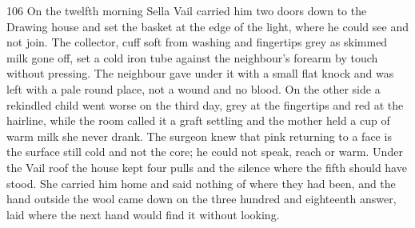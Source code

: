\begin{CRchronicle}{106}
On the twelfth morning Sella Vail carried him two doors down to the Drawing house and set the basket at the edge of the light, where he could see and not join. The collector, cuff soft from washing and fingertips grey as skimmed milk gone off, set a cold iron tube against the neighbour’s forearm by touch without pressing. The neighbour gave under it with a small flat knock and was left with a pale round place, not a wound and no blood. On the other side a rekindled child went worse on the third day, grey at the fingertips and red at the hairline, while the room called it a graft settling and the mother held a cup of warm milk she never drank. The surgeon knew that pink returning to a face is the surface still cold and not the core; he could not speak, reach or warm. Under the Vail roof the house kept four pulls and the silence where the fifth should have stood. She carried him home and said nothing of where they had been, and the hand outside the wool came down on the three hundred and eighteenth answer, laid where the next hand would find it without looking.
\end{CRchronicle}
